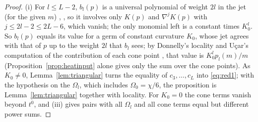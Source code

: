\documentclass[pdflatex,sn-mathphys-num]{sn-jnl}
\theoremstyle{thmstyleone}%
\theoremstyle{thmstylethree}%
\begin{document}
\begin{proof}
(i) For $l\le L-2$, $b_l(p)$ is a universal polynomial of weight $2l$ in the jet (for the given $m$) \cite{donnelly1976}, \cite[4.1, Thm~4.8]{dggw2008}, so it involves only $K(p)$ and $\nabla^jK(p)$ with $j\le2l-2\le2L-6$, which vanish; the only monomial left is a constant times $K_0^l$. So $b_l(p)$ equals its value for a germ of constant curvature $K_0$, whose jet agrees with that of $p$ up to the weight $2l$ that $b_l$ sees; by Donnelly's locality \cite[Thm~4.8]{dggw2008} and U\c{c}ar's computation of the contribution of each cone point \cite[Thm~4.20]{ucar2017}, that value is $K_0^lp_l(m)/m$ (Proposition~\ref{prop:heatinput} alone gives only the sum over the cone points). As $K_0\ne0$, Lemma~\ref{lem:triangular} turns the equality of $c_3,\dots,c_L$ into \eqref{eq:red1}; with the hypothesis on the $\Omega_l$, which includes $\Omega_0=\chi/6$, the proposition is Lemma~\ref{lem:triangular} together with locality. For $K_0=0$ the cone terms vanish beyond $t^0$, and (iii) gives pairs with all $\Omega_l$ and all cone terms equal but different power sums.


\end{proof}
\end{document}
